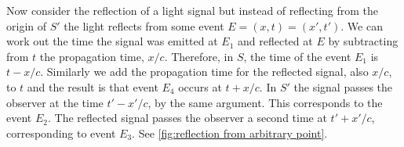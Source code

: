 \documentclass[fleqn]{NotesClass}
\begin{document}
    Now consider the reflection of a light signal but instead of reflecting from the origin of \(S'\) the light reflects from some event \(E = (x, t) = (x', t')\).
    We can work out the time the signal was emitted at \(E_1\) and reflected at \(E\) by subtracting from \(t\) the propagation time, \(x/c\).
    Therefore, in \(S\), the time of the event \(E_1\) is \(t - x/c\).
    Similarly we add the propagation time for the reflected signal, also \(x/c\), to \(t\) and the result is that event \(E_4\) occurs at \(t + x/c\).
    In \(S'\) the signal passes the observer at the time \(t' - x'/c\), by the same argument.
    This corresponds to the event \(E_2\).
    The reflected signal passes the observer a second time at \(t' + x'/c\), corresponding to event \(E_3\).
    See \cref{fig:reflection from arbitrary point}.
    
\end{document}
